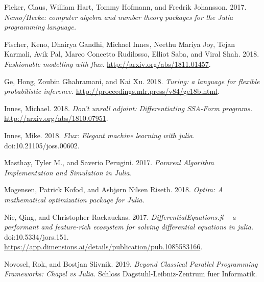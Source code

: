 \protect\hypertarget{ref-fieker2017}{}Fieker, Claus, William Hart, Tommy Hofmann, and Fredrik Johansson. 2017. \textit{Nemo/Hecke: computer algebra and number theory packages for the Julia programming language. }\par
\protect\hypertarget{ref-innes2018a}{}Fischer, Keno, Dhairya Gandhi, Michael Innes, Neethu Mariya Joy, Tejan Karmali, Avik Pal, Marco Concetto Rudilosso, Elliot Saba, and Viral Shah. 2018. \textit{Fashionable modelling with flux. }\href{http://arxiv.org/abs/1811.01457}{http://arxiv.org/abs/1811.01457}. \par
\protect\hypertarget{ref-ge2018}{}Ge, Hong, Zoubin Ghahramani, and Kai Xu. 2018. \textit{Turing: a language for flexible probabilistic inference. }\href{http://proceedings.mlr.press/v84/ge18b.html}{http://proceedings.mlr.press/v84/ge18b.html}. \par
\protect\hypertarget{ref-innes2018}{}Innes, Michael. 2018. \textit{Don't unroll adjoint: Differentiating SSA-Form programs. }\href{http://arxiv.org/abs/1810.07951}{http://arxiv.org/abs/1810.07951}. \par
\protect\hypertarget{ref-innes2018b}{}Innes, Mike. 2018. \textit{Flux: Elegant machine learning with julia. }doi:10.21105/joss.00602. \par
\protect\hypertarget{ref-masthay2017}{}Masthay, Tyler M., and Saverio Perugini. 2017. \textit{Parareal Algorithm Implementation and Simulation in Julia. }\par
\protect\hypertarget{ref-mogensen2018}{}Mogensen, Patrick Kofod, and Asbjørn Nilsen Riseth. 2018. \textit{Optim: A mathematical optimization package for Julia. }\par
\protect\hypertarget{ref-rackauckas2017}{}Nie, Qing, and Christopher Rackauckas. 2017. \textit{DifferentialEquations.jl – a performant and feature-rich ecosystem for solving differential equations in julia. }doi:10.5334/jors.151. \href{https://app.dimensions.ai/details/publication/pub.1085583166}{https://app.dimensions.ai/details/publication/pub.1085583166}. \par
\protect\hypertarget{ref-novosel2019}{}Novosel, Rok, and Bostjan Slivnik. 2019. \textit{Beyond Classical Parallel Programming Frameworks: Chapel vs Julia. }Schloss Dagstuhl-Leibniz-Zentrum fuer Informatik. \par
